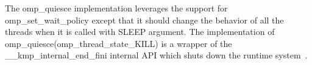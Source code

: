 The {\sf omp\_quiesce} implementation leverages the support for {\sf omp\_set\_wait\_policy} except that it 
should change the behavior of all the threads when it is called with SLEEP argument. 
The implementation of {\sf omp\_quiesce(omp\_thread\_state\_KILL)} is a wrapper of 
the {\sf \_\_kmp\_internal\_end\_fini} internal API which shuts down the runtime system~\cite{iccmanual}. 


